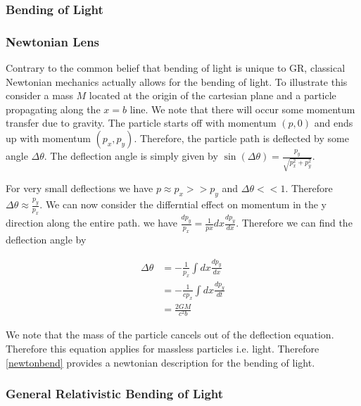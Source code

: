 \subsubsection{Bending of Light}

\subsubsection{Newtonian Lens}

Contrary to the common belief that bending of light is unique to GR, classical Newtonian mechanics actually 
allows for the bending of light. To illustrate this 
consider a mass $M$ located at the origin of the cartesian plane and a particle propagating along the $x=b$ line.
We note that there will occur some momentum transfer due to gravity. The particle starts off with 
momentum $(p,0)$ and ends up with momentum $(p_x,p_y)$.
Therefore, the particle path is deflected by some angle $\Delta \theta$. The deflection angle is 
simply given by $\sin(\Delta \theta) = \frac{p_y}{\sqrt{p_x^2+p_y^2}}$.
\par For very small deflections we have $p\approx p_x >> p_y$ and $\Delta \theta << 1$. Therefore $\Delta \theta
\approx \frac{p_y}{p_x}$. We can now consider the differntial effect on momentum in the y direction along the 
entire path. we have $\frac{dp_y}{p_x} = \frac{1}{px} dx \frac{dp_y}{dx}$. Therefore we can find the deflection
angle by 

\begin{equation}
  \begin{split}
  \Delta \theta &= -\frac{1}{p_x} \int dx \frac{dp_y}{dx} \\
  &= -\frac{1}{cp_x} \int dx \frac{dp_y}{dt} \\ 
  &= \frac{2GM}{c^2b}
  \end{split}  
  \label{newtonbend}
\end{equation}

We note that the mass of the particle cancels out of the deflection equation. Therefore this equation applies
for massless particles i.e. light. Therefore \autoref{newtonbend} provides a newtonian description for the 
bending of light.

\subsubsection{General Relativistic Bending of Light}
  
  
